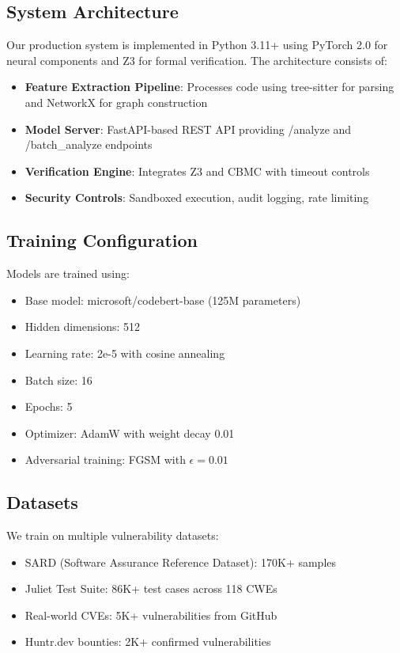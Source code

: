\documentclass[10pt,journal,compsoc]{IEEEtran}
\begin{document}
\subsection{System Architecture}
Our production system is implemented in Python 3.11+ using PyTorch 2.0 for neural components and Z3 for formal verification. The architecture consists of:

\begin{itemize}
\item \textbf{Feature Extraction Pipeline}: Processes code using tree-sitter for parsing and NetworkX for graph construction
\item \textbf{Model Server}: FastAPI-based REST API providing /analyze and /batch\_analyze endpoints
\item \textbf{Verification Engine}: Integrates Z3 and CBMC with timeout controls
\item \textbf{Security Controls}: Sandboxed execution, audit logging, rate limiting
\end{itemize}

\subsection{Training Configuration}
Models are trained using:
\begin{itemize}
\item Base model: microsoft/codebert-base (125M parameters)
\item Hidden dimensions: 512
\item Learning rate: 2e-5 with cosine annealing
\item Batch size: 16
\item Epochs: 5
\item Optimizer: AdamW with weight decay 0.01
\item Adversarial training: FGSM with $\epsilon = 0.01$
\end{itemize}

\subsection{Datasets}
We train on multiple vulnerability datasets:
\begin{itemize}
\item SARD (Software Assurance Reference Dataset): 170K+ samples
\item Juliet Test Suite: 86K+ test cases across 118 CWEs
\item Real-world CVEs: 5K+ vulnerabilities from GitHub
\item Huntr.dev bounties: 2K+ confirmed vulnerabilities
\end{itemize}
\end{document}

